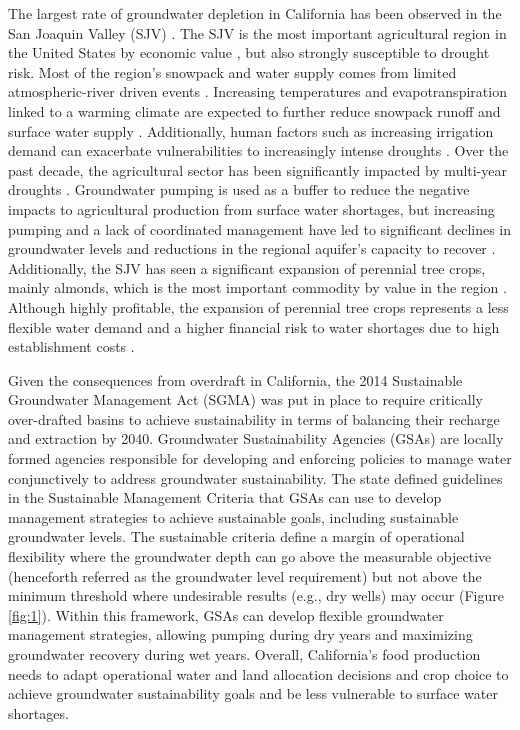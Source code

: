 \documentclass[a4paper,fleqn]{cas-sc}
\begin{document}
The largest rate of groundwater depletion in California has been observed in the San Joaquin Valley (SJV) \citep{ojha_sustained_2018}. The SJV is the most important agricultural region in the United States by economic value \citep{usda_national_2020}, but also strongly susceptible to drought risk. Most of the region’s snowpack and water supply comes from limited atmospheric-river driven events \citep{espinoza_global_2018}. Increasing temperatures and evapotranspiration linked to a warming climate are expected to further reduce snowpack runoff and surface water supply \citep{fernandez-bou_regional_2021,vahmani_will_2022}. Additionally, human factors such as increasing irrigation demand can exacerbate vulnerabilities to increasingly intense droughts \citep{he_intensification_2017}. Over the past decade, the agricultural sector has been significantly impacted by multi-year droughts \citep{lund_lessons_2018,medellin-azuara_economic_2022}. Groundwater pumping is used as a buffer to reduce the negative impacts to agricultural production from surface water shortages, but increasing pumping and a lack of coordinated management have led to significant declines in groundwater levels and reductions in the regional aquifer's capacity to recover \citep{liu_groundwater_2022}.  Additionally, the SJV has seen a significant expansion of perennial tree crops, mainly almonds, which is the most important commodity by value in the region \citep{usda_national_2020}. Although highly profitable, the expansion of perennial tree crops represents a less flexible water demand and a higher financial risk to water shortages due to high establishment costs \citep{mall_water_2019,qin_flexibility_2019}.   

Given the consequences from overdraft in California, the 2014 Sustainable Groundwater Management Act (SGMA) \citep{dwr_sustainable_2021} was put in place to require critically over-drafted basins to achieve sustainability in terms of balancing their recharge and extraction by 2040. Groundwater Sustainability Agencies (GSAs) are locally formed agencies responsible for developing and enforcing policies to manage water conjunctively to address groundwater sustainability. The state defined guidelines in the Sustainable Management Criteria \citep{dwr_sustainable_2017} that GSAs can use to develop management strategies to achieve sustainable goals, including sustainable groundwater levels. The sustainable criteria define a margin of operational flexibility where the groundwater depth can go above the measurable objective (henceforth referred as the groundwater level requirement) but not above the minimum threshold where undesirable results (e.g., dry wells) may occur (Figure \ref{fig:1}). Within this framework, GSAs can develop flexible groundwater management strategies, allowing pumping during dry years and maximizing groundwater recovery during wet years. Overall, California's food production needs to adapt operational water and land allocation decisions and crop choice to achieve groundwater sustainability goals and be less vulnerable to surface water shortages. 
\end{document}
